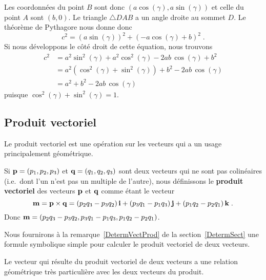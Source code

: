 {\begin{rmk}[\theory]

Les coordonnées du point $B$ sont donc
$(a\cos(\gamma), a \sin(\gamma))$ et celle du point $A$ sont $(b,0)$.
Le triangle $\triangle DAB$ a un angle droite au sommet $D$.  Le
théorème de Pythagore nous donne donc
\[
c^2 = \left( a\sin(\gamma) \right)^2 + \left( -a\cos(\gamma) + b\right)^2 \; .
\]
Si nous développons le côté droit de cette équation, nous trouvons
\begin{align*}
c^2 &= a^2 \sin^2(\gamma) + a^2 \cos^2(\gamma) - 2 ab\, \cos(\gamma) +b^2 \\
&= a^2 \left(\cos^2(\gamma)+\sin^2(\gamma)\right) + b^2 - 2ab\,\cos(\gamma) \\
&= a^2 + b^2 - 2ab\,\cos(\gamma)
\end{align*}
puisque $\cos^2(\gamma) + \sin^2(\gamma) = 1$.
\end{rmk}

\subsection{Produit vectoriel \eng}\label{PROD_VECT}

Le produit vectoriel est une opération sur les vecteurs qui a un
usage principalement géométrique.

\begin{focus}{\dfn} 
Si $\mathbf{p} = (p_1,p_2,p_3)$ et $\mathbf{q} = (q_1, q_2, q_3)$ sont deux
vecteurs qui ne sont pas colinéaires (i.e.\ dont l'un n'est pas un
multiple de l'autre), nous définissons le
{\bfseries produit vectoriel} des vecteurs
$\mathbf{p}$ et $\mathbf{q}$ comme étant le vecteur
\begin{equation}\label{sp_form}
\mathbf{m} = \mathbf{p} \times \mathbf{q} =
\left(p_2 q_3 - p_3 q_2\right)\mathbf{i} + \left(p_3 q_1 - p_1 q_3\right) \mathbf{j}
+ \left(p_1 q_2 - p_2 q_1\right) \mathbf{k} \; .
\end{equation}
Donc $\mathbf{m} = \left(p_2 q_3 - p_3 q_2, p_3 q_1 - p_1 q_3,
p_1 q_2 - p_2 q_1\right)$.
\label{VecTProdDef}
\end{focus}

Nous fournirons à la remarque~\ref{DetermVectProd} de la
section~\ref{DetermSect} une formule symbolique simple pour calculer
le produit vectoriel de deux vecteurs.

Le vecteur qui résulte du produit vectoriel de deux vecteurs a une relation
géométrique très particulière avec les deux vecteurs du produit.

}
